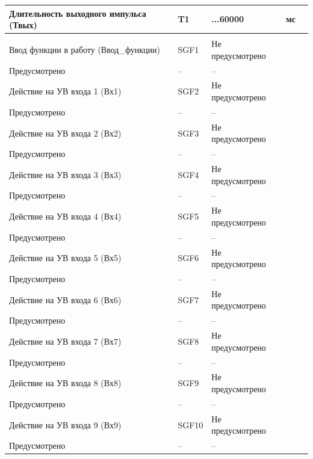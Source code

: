 \begin{longtable}{|>{\centering\arraybackslash}m{5.3cm}|>{\centering\arraybackslash}m{3.3cm}|>{\centering\arraybackslash}m{4.2cm}|>{\centering\arraybackslash}m{1.8cm}|>{\centering\arraybackslash}m{1cm}|}
\hline
\centering Длительность выходного импульса (Твых)  & \centering T1 & \centering 50...60000 & \centering мс & \centering \arraybackslash 10 \\
\hline
\multicolumn{5}{|c|}{ УВ9 } \\ \hline 
\centering Ввод функции в работу (Ввод\_функции)  & \centering SGF1 & \centering Не предусмотрено \\ Предусмотрено & \centering -- & \centering \arraybackslash -- \\
\hline
\centering Действие на УВ входа 1 (Вх1)  & \centering SGF2 & \centering Не предусмотрено \\ Предусмотрено & \centering -- & \centering \arraybackslash -- \\
\hline
\centering Действие на УВ входа 2 (Вх2)  & \centering SGF3 & \centering Не предусмотрено \\ Предусмотрено & \centering -- & \centering \arraybackslash -- \\
\hline
\centering Действие на УВ входа 3 (Вх3)  & \centering SGF4 & \centering Не предусмотрено \\ Предусмотрено & \centering -- & \centering \arraybackslash -- \\
\hline
\centering Действие на УВ входа 4 (Вх4)  & \centering SGF5 & \centering Не предусмотрено \\ Предусмотрено & \centering -- & \centering \arraybackslash -- \\
\hline
\centering Действие на УВ входа 5 (Вх5)  & \centering SGF6 & \centering Не предусмотрено \\ Предусмотрено & \centering -- & \centering \arraybackslash -- \\
\hline
\centering Действие на УВ входа 6 (Вх6)  & \centering SGF7 & \centering Не предусмотрено \\ Предусмотрено & \centering -- & \centering \arraybackslash -- \\
\hline
\centering Действие на УВ входа 7 (Вх7)  & \centering SGF8 & \centering Не предусмотрено \\ Предусмотрено & \centering -- & \centering \arraybackslash -- \\
\hline
\centering Действие на УВ входа 8 (Вх8)  & \centering SGF9 & \centering Не предусмотрено \\ Предусмотрено & \centering -- & \centering \arraybackslash -- \\
\hline
\centering Действие на УВ входа 9 (Вх9)  & \centering SGF10 & \centering Не предусмотрено \\ Предусмотрено & \centering -- & \centering \arraybackslash -- \\

\end{longtable}
